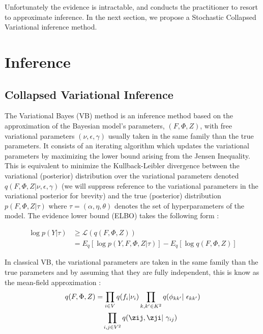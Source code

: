 Unfortunately the evidence is intractable, and conducts the practitioner to resort to approximate inference. In the next section, we propose a Stochastic Collapsed Variational inference method.





\section{Inference}


\subsection{Collapsed Variational Inference}

The Variational Bayes (VB) method is an inference method based on the approximation of the Bayesian model's parameters, $(F, \Phi, Z)$, with free variational parameters $(\nu, \epsilon, \gamma)$ usually taken in the same family than the true parameters. It consists of an iterating algorithm which updates the variational parameters by maximizing the lower bound arising from the Jensen Inequality. This is equivalent to  minimize the Kullback-Leibler divergence between the variational (posterior) distribution over the variational parameters denoted $q(F, \Phi, Z | \nu, \epsilon, \gamma)$ (we will suppress reference to the variational parameters in the variational posterior for brevity) and the true (posterior) distribution $p(F, \Phi, Z | \tau)$ where $\tau = (\alpha, \eta, \theta)$ denotes the set of hyperparameters of the model. The evidence lower bound (ELBO) takes the following form :

\begin{align*}
    \log p(Y | \tau) &\geq \mathcal{L}(q(F, \Phi, Z)) \\
    &= E_q[\log p(Y, F, \Phi, Z | \tau)] - E_q[\log q(F, \Phi, Z)] \nonumber \nonumber
\end{align*}

In classical VB, the variational parameters are taken in the same family than the true parameters and by assuming that they are fully independent, this is know as the mean-field approximation :
\begin{align*}
q(F, \Phi, Z) &= \prod_{i\in V}q(f_i | \nu_i) \prod_{k,k' \in K^2}q(\phi_{kk'} | \epsilon_{kk'}) \\
    &\quad \prod_{i,j \in V^2}q(\zij, \zji | \gamma_{ij})
\end{align*}

